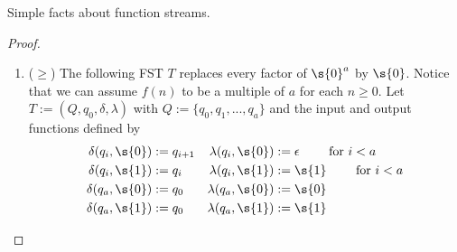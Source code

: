\begin{lemma}{Simple facts about function streams.}
\begin{proof}
\begin{enumerate}
			This transducer is shown below in \cref{fig:simple_fs_facts.shift}.
			\begin{figure}[H]
				\centering
				\caption{A transducer that shifts a function stream by $k$ blocks.}
				\label{fig:simple_fs_facts.shift}
			\end{figure}
			($\leq$) Let $w := \bs{n}{0}{k+1}$ be the word equal to the first $k$ blocks of $\fs{f}$. By \cref{basic_ineq}.\ref{basic_ineq.prepend} we know that $\fs{\shift{k}{f}} \geq w \cdot \fs{\shift{k}{f}} = \fs{f}$.
			\item ($\geq$) The following FST $T$ replaces every factor of $\s{0}^a$ by $\s{0}$. Notice that we can assume $f(n)$ to be a multiple of $a$ for each $n\geq0$. Let $T := (Q,q_0,\delta,\lambda)$ with $Q := \{q_0,q_1,...,q_{a}\}$ and the input and output functions defined by 
			\begin{align*}
				\delta(q_i, \s{0}) &:= q_{i + 1} & \lambda(q_i,\s{0}) &:= \epsilon \qquad\text{ for } i < a\\
				\delta(q_i, \s{1}) &:= q_i & \lambda(q_i,\s{1}) &:= \s{1} \qquad\text{ for } i < a\\
				\delta(q_{a}, \s{0}) &:= q_{0} & \lambda(q_{a},\s{0}) &:= \s{0} \\
				\delta(q_{a}, \s{1}) &:= q_{0} & \lambda(q_{a},\s{1}) &:= \s{1}
			\end{align*}
			\begin{figure}[H]
				\centering
\end{figure}
\end{enumerate}
\end{proof}
\end{lemma}
